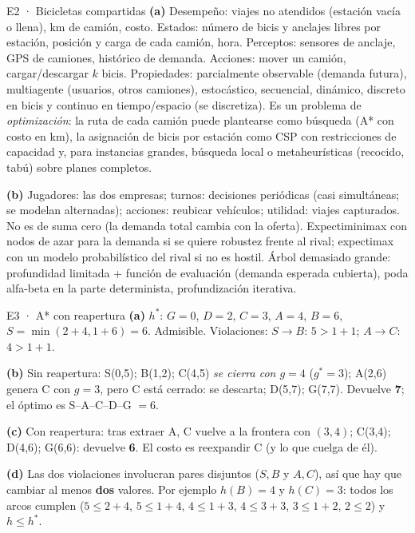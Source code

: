 \begin{solucion}{E2 · Bicicletas compartidas}
\textbf{(a)} Desempeño: viajes no atendidos (estación vacía o llena), km de camión, costo. Estados: número
de bicis y anclajes libres por estación, posición y carga de cada camión, hora. Perceptos: sensores de
anclaje, GPS de camiones, histórico de demanda. Acciones: mover un camión, cargar/descargar $k$ bicis.
Propiedades: parcialmente observable (demanda futura), multiagente (usuarios, otros camiones), estocástico,
secuencial, dinámico, discreto en bicis y continuo en tiempo/espacio (se discretiza). Es un problema de
\emph{optimización}: la ruta de cada camión puede plantearse como búsqueda (A* con costo en km), la
asignación de bicis por estación como CSP con restricciones de capacidad y, para instancias grandes,
búsqueda local o metaheurísticas (recocido, tabú) sobre planes completos.

\textbf{(b)} Jugadores: las dos empresas; turnos: decisiones periódicas (casi simultáneas; se modelan
alternadas); acciones: reubicar vehículos; utilidad: viajes capturados. No es de suma cero (la demanda
total cambia con la oferta). Expectiminimax con nodos de azar para la demanda si se quiere robustez frente
al rival; expectimax con un modelo probabilístico del rival si no es hostil. Árbol demasiado grande:
profundidad limitada + función de evaluación (demanda esperada cubierta), poda alfa-beta en la parte
determinista, profundización iterativa.
\end{solucion}

\begin{solucion}{E3 · A* con reapertura}
\textbf{(a)} $h^*$: $G=0$, $D=2$, $C=3$, $A=4$, $B=6$, $S=\min(2+4,1+6)=6$. Admisible. Violaciones:
$S\to B$: $5>1+1$; $A\to C$: $4>1+1$.

\textbf{(b)} Sin reapertura: S(0,5); B(1,2); C(4,5) \emph{se cierra con $g=4$} ($g^*=3$); A(2,6) genera C con $g=3$,
pero C está cerrado: se descarta; D(5,7); G(7,7). Devuelve \textbf{7}; el óptimo es S–A–C–D–G $=6$.

\textbf{(c)} Con reapertura: tras extraer A, C vuelve a la frontera con $(3,4)$; C(3,4); D(4,6); G(6,6):
devuelve \textbf{6}. El costo es reexpandir C (y lo que cuelga de él).

\textbf{(d)} Las dos violaciones involucran pares disjuntos ($S,B$ y $A,C$), así que hay que cambiar al menos
\textbf{dos} valores. Por ejemplo $h(B)=4$ y $h(C)=3$: todos los arcos cumplen ($5\le2+4$, $5\le1+4$, $4\le1+3$,
$4\le3+3$, $3\le1+2$, $2\le2$) y $h\le h^*$.
\end{solucion}

